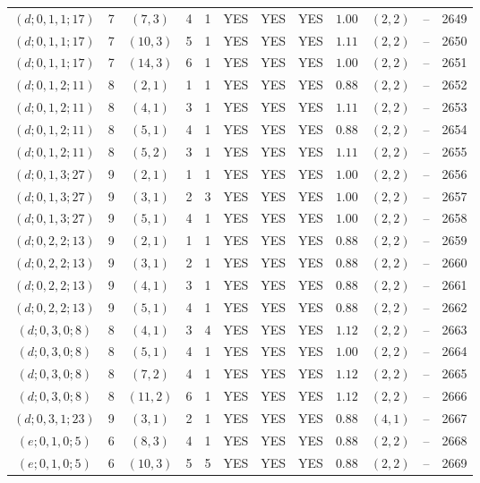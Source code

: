 \begin{longtable}{|c|c|c|c|c|c|c|c|c|c|c|c|}
$(d;0,1,1;17)$ & 7 & $(7,3)$ & 4 & 1 & YES & YES & YES & $1.00$ & $(2,2)$ & -- & 2649\\
$(d;0,1,1;17)$ & 7 & $(10,3)$ & 5 & 1 & YES & YES & YES & $1.11$ & $(2,2)$ & -- & 2650\\
$(d;0,1,1;17)$ & 7 & $(14,3)$ & 6 & 1 & YES & YES & YES & $1.00$ & $(2,2)$ & -- & 2651\\
$(d;0,1,2;11)$ & 8 & $(2,1)$ & 1 & 1 & YES & YES & YES & $0.88$ & $(2,2)$ & -- & 2652\\
$(d;0,1,2;11)$ & 8 & $(4,1)$ & 3 & 1 & YES & YES & YES & $1.11$ & $(2,2)$ & -- & 2653\\
$(d;0,1,2;11)$ & 8 & $(5,1)$ & 4 & 1 & YES & YES & YES & $0.88$ & $(2,2)$ & -- & 2654\\
$(d;0,1,2;11)$ & 8 & $(5,2)$ & 3 & 1 & YES & YES & YES & $1.11$ & $(2,2)$ & -- & 2655\\
$(d;0,1,3;27)$ & 9 & $(2,1)$ & 1 & 1 & YES & YES & YES & $1.00$ & $(2,2)$ & -- & 2656\\
$(d;0,1,3;27)$ & 9 & $(3,1)$ & 2 & 3 & YES & YES & YES & $1.00$ & $(2,2)$ & -- & 2657\\
$(d;0,1,3;27)$ & 9 & $(5,1)$ & 4 & 1 & YES & YES & YES & $1.00$ & $(2,2)$ & -- & 2658\\
$(d;0,2,2;13)$ & 9 & $(2,1)$ & 1 & 1 & YES & YES & YES & $0.88$ & $(2,2)$ & -- & 2659\\
$(d;0,2,2;13)$ & 9 & $(3,1)$ & 2 & 1 & YES & YES & YES & $0.88$ & $(2,2)$ & -- & 2660\\
$(d;0,2,2;13)$ & 9 & $(4,1)$ & 3 & 1 & YES & YES & YES & $0.88$ & $(2,2)$ & -- & 2661\\
$(d;0,2,2;13)$ & 9 & $(5,1)$ & 4 & 1 & YES & YES & YES & $0.88$ & $(2,2)$ & -- & 2662\\
$(d;0,3,0;8)$ & 8 & $(4,1)$ & 3 & 4 & YES & YES & YES & $1.12$ & $(2,2)$ & -- & 2663\\
$(d;0,3,0;8)$ & 8 & $(5,1)$ & 4 & 1 & YES & YES & YES & $1.00$ & $(2,2)$ & -- & 2664\\
$(d;0,3,0;8)$ & 8 & $(7,2)$ & 4 & 1 & YES & YES & YES & $1.12$ & $(2,2)$ & -- & 2665\\
$(d;0,3,0;8)$ & 8 & $(11,2)$ & 6 & 1 & YES & YES & YES & $1.12$ & $(2,2)$ & -- & 2666\\
$(d;0,3,1;23)$ & 9 & $(3,1)$ & 2 & 1 & YES & YES & YES & $0.88$ & $(4,1)$ & -- & 2667\\
$(e;0,1,0;5)$ & 6 & $(8,3)$ & 4 & 1 & YES & YES & YES & $0.88$ & $(2,2)$ & -- & 2668\\
$(e;0,1,0;5)$ & 6 & $(10,3)$ & 5 & 5 & YES & YES & YES & $0.88$ & $(2,2)$ & -- & 2669\\

\end{longtable}
